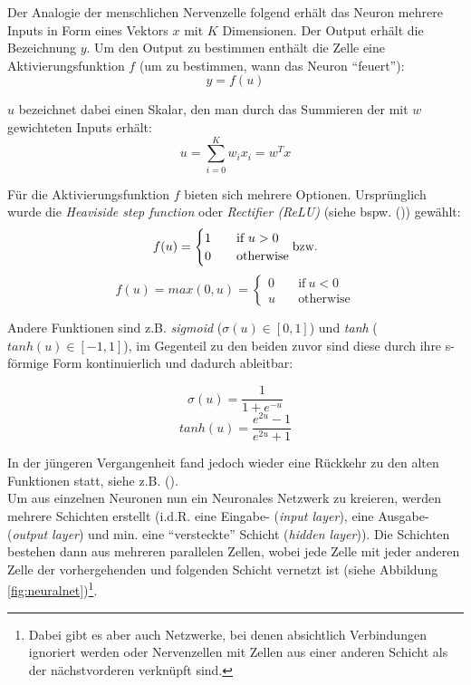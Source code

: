 Der Analogie der menschlichen Nervenzelle folgend erhält das Neuron mehrere Inputs in Form eines Vektors $x$ mit $K$
Dimensionen. Der Output erhält die Bezeichnung $y$. Um den Output zu bestimmen enthält die Zelle eine Aktivierungsfunktion
$f$ (um zu bestimmen, wann das Neuron ``feuert''):
\begin{equation}
  y = f(u)
\end{equation}

$u$ bezeichnet dabei einen Skalar, den man durch das Summieren der mit $w$ gewichteten Inputs erhält:
\begin{equation}
  u = \sum_{i=0}^{K} w_i x_i = w^T x
\end{equation}

Für die Aktivierungsfunktion $f$ bieten sich mehrere Optionen. Ursprünglich wurde die \emph{Heaviside step function}
oder \emph{Rectifier (ReLU)} (siehe bspw. (\cite{abramowitz1964handbook})) gewählt:
\begin{equation}
    f(u) = \begin{cases} 1 & \quad \text{if}\ u > 0 \\ 0 & \quad \text{otherwise} \\ \end{cases} \text{bzw.} \\
\end{equation}
\begin{equation}
  f(u) = max(0,u) = \begin{cases} 0 & \quad \text{if}\ u < 0 \\ u & \quad \text{otherwise} \end{cases}
\end{equation}

Andere Funktionen sind z.B. \emph{sigmoid} ($\sigma(u) \in [0,1]$)
und \emph{tanh} ($tanh(u) \in [-1, 1]$), im Gegenteil zu den beiden zuvor sind diese durch ihre s-förmige Form
kontinuierlich und dadurch ableitbar:

\begin{equation}
  \sigma(u) = \frac{1}{1 + e^{-u}}
\end{equation}
\begin{equation}
  tanh(u) = \frac{e^{2u}-1}{e^{2u}+1}
\end{equation}

In der jüngeren Vergangenheit fand jedoch wieder eine Rückkehr zu den alten Funktionen statt, siehe z.B. (\cite{maas2013rectifier}).\\

Um aus einzelnen Neuronen nun ein Neuronales Netzwerk zu kreieren, werden mehrere Schichten erstellt (i.d.R. eine Eingabe-
(\emph{input layer}), eine Ausgabe- (\emph{output layer}) und min. eine ``versteckte'' Schicht (\emph{hidden layer})).
Die Schichten bestehen dann aus mehreren parallelen Zellen, wobei jede Zelle mit jeder anderen Zelle der vorhergehenden und
folgenden Schicht vernetzt ist (siehe Abbildung \ref{fig:neuralnet})\footnote{Dabei gibt es aber auch Netzwerke, bei denen
absichtlich Verbindungen ignoriert werden oder Nervenzellen mit Zellen aus einer anderen Schicht als der nächstvorderen
verknüpft sind.}.

